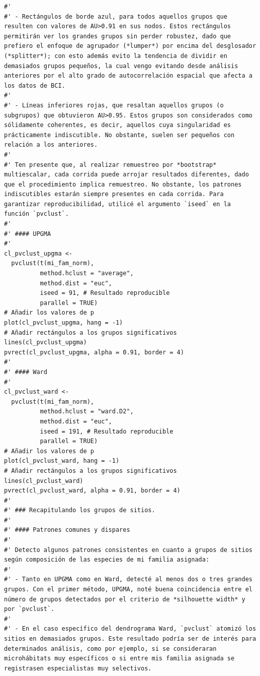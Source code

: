 \documentclass[11pt,]{article}
\begin{document}
\begin{verbatim}
#' 
#' - Rectángulos de borde azul, para todos aquellos grupos que resulten con valores de AU>0.91 en sus nodos. Estos rectángulos permitirán ver los grandes grupos sin perder robustez, dado que prefiero el enfoque de agrupador (*lumper*) por encima del desglosador (*splitter*); con esto además evito la tendencia de dividir en demasiados grupos pequeños, la cual vengo evitando desde análisis anteriores por el alto grado de autocorrelación espacial que afecta a los datos de BCI.
#' 
#' - Líneas inferiores rojas, que resaltan aquellos grupos (o subgrupos) que obtuvieron AU>0.95. Estos grupos son considerados como sólidamente coherentes, es decir, aquellos cuya singularidad es prácticamente indiscutible. No obstante, suelen ser pequeños con relación a los anteriores.
#' 
#' Ten presente que, al realizar remuestreo por *bootstrap* multiescalar, cada corrida puede arrojar resultados diferentes, dado que el procedimiento implica remuestreo. No obstante, los patrones indiscutibles estarán siempre presentes en cada corrida. Para garantizar reproducibilidad, utilicé el argumento `iseed` en la función `pvclust`.
#' 
#' #### UPGMA
#' 
cl_pvclust_upgma <-
  pvclust(t(mi_fam_norm),
          method.hclust = "average",
          method.dist = "euc",
          iseed = 91, # Resultado reproducible
          parallel = TRUE)
# Añadir los valores de p
plot(cl_pvclust_upgma, hang = -1)
# Añadir rectángulos a los grupos significativos
lines(cl_pvclust_upgma)
pvrect(cl_pvclust_upgma, alpha = 0.91, border = 4)
#' 
#' #### Ward
#' 
cl_pvclust_ward <-
  pvclust(t(mi_fam_norm),
          method.hclust = "ward.D2",
          method.dist = "euc",
          iseed = 191, # Resultado reproducible
          parallel = TRUE)
# Añadir los valores de p
plot(cl_pvclust_ward, hang = -1)
# Añadir rectángulos a los grupos significativos
lines(cl_pvclust_ward)
pvrect(cl_pvclust_ward, alpha = 0.91, border = 4)
#' 
#' ### Recapitulando los grupos de sitios.
#' 
#' #### Patrones comunes y dispares
#' 
#' Detecto algunos patrones consistentes en cuanto a grupos de sitios según composición de las especies de mi familia asignada:
#' 
#' - Tanto en UPGMA como en Ward, detecté al menos dos o tres grandes grupos. Con el primer método, UPGMA, noté buena coincidencia entre el número de grupos detectados por el criterio de *silhouette width* y por `pvclust`.
#' 
#' - En el caso específico del dendrograma Ward, `pvclust` atomizó los sitios en demasiados grupos. Este resultado podría ser de interés para determinados análisis, como por ejemplo, si se consideraran microhábitats muy específicos o si entre mis familia asignada se registrasen especialistas muy selectivos.

\end{verbatim}
\end{document}
